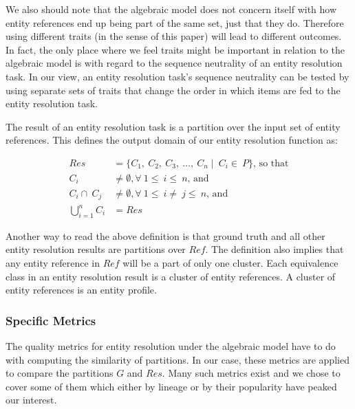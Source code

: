 We also should note that the algebraic model does not concern itself with
how entity references end up being part of the same set, just that they do.
Therefore using different traits (in the sense of this paper) will lead to
different outcomes.
In fact, the only place where we feel traits might be important in relation
to the algebraic model is with regard to the sequence neutrality of an
entity resolution task.
In our view, an entity resolution task's sequence neutrality can be tested
by using separate sets of traits that change the order in which items are
fed to the entity resolution task.

The result of an entity resolution task is a partition over the input set of
entity references.
This defines the output domain of our entity resolution function as:

\begin{align}
    Res &= \{C_1,~C_2,~C_3,~\ldots,~C_n\mid~C_i\in~P\}\textrm{, so that}\nonumber\\
    C_i&\neq\emptyset,\forall~1\leq~i\leq~n\textrm{,~and}\nonumber\\
    C_i\cap~C_j&\neq\emptyset,\forall~1\leq~i\neq~j\leq~n\textrm{,~and}\nonumber\\
    \bigcup_{i=1}^{n}C_i&=Res\nonumber
\end{align}

Another way to read the above definition is that ground truth and all other
entity resolution results are partitions over $Ref$.
The definition also implies that any entity reference in $Ref$ will be a
part of only one cluster.
Each equivalence class in an entity resolution result is a cluster of entity
references.
A cluster of entity references is an entity profile.

\subsubsection[algeval]{Specific Metrics}\label{subsubsec:algeval}

The quality metrics for entity resolution under the algebraic model have to
do with computing the similarity of partitions.
In our case, these metrics are applied to compare the partitions $G$ and
$Res$.
Many such metrics exist\cite{hitesh2012} and we chose to cover some of them
which either by lineage or by their popularity have peaked our interest.

